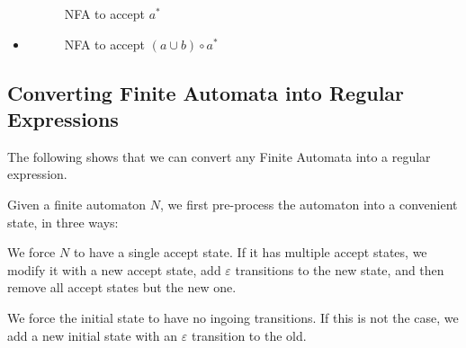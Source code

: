 \documentclass[11pt]{article}
\begin{document}
\begin{itemize}
\begin{figure}[H]
		      \caption{NFA to accept $a^\ast$}
		      \label{fig:re2nfa4}
	      \end{figure}
	\item[]
	      \begin{figure}[H]
		      \centering
					\caption{NFA to accept $(a \cup b) \circ a^\ast$}
		      \label{fig:re2nfa5}
	      \end{figure}
\end{itemize}

\subsection{Converting Finite Automata into Regular Expressions}
The following shows that we can convert any Finite Automata into a regular
expression.

Given a finite automaton $N$, we first pre-process the automaton into a
convenient state, in three ways:

We force $N$ to have a single accept state. If it has multiple accept states,
we modify it with a new accept state, add $\varepsilon$ transitions to the new
state, and then remove all accept states but the new one.

We force the initial state to have no ingoing transitions. If this is not
the case, we add a new initial state with an $\varepsilon$ transition to the
old.
\end{document}
